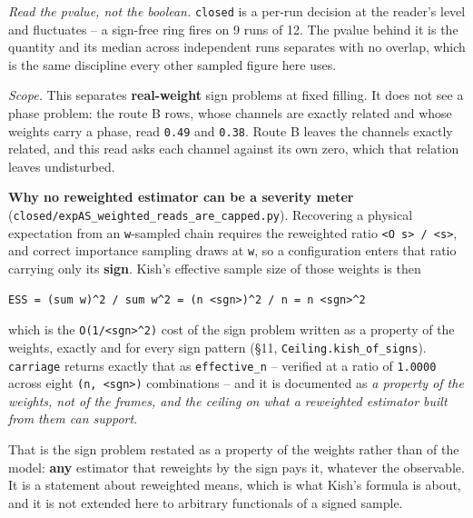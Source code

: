 \documentclass[10pt,letterpaper,twocolumn]{article}
\begin{document}
\emph{Read the pvalue, not the boolean.} \texttt{closed} is a per-run decision at the reader's level and
fluctuates -- a sign-free ring fires on 9 runs of 12. The pvalue behind it is the quantity and its
median across independent runs separates with no overlap, which is the same discipline every other
sampled figure here uses.

\emph{Scope.} This separates \textbf{real-weight} sign problems at fixed filling. It does not see a phase
problem: the route B rows, whose channels are exactly related and whose weights carry a phase,
read \texttt{0.\allowbreak{}49} and \texttt{0.\allowbreak{}38}. Route B leaves the channels exactly related, and this read asks each
channel against its own zero, which that relation leaves undisturbed.

\textbf{Why no reweighted estimator can be a severity meter}
(\texttt{closed/\allowbreak{}expAS\_\allowbreak{}weighted\_\allowbreak{}reads\_\allowbreak{}are\_\allowbreak{}capped.\allowbreak{}py}). Recovering a physical expectation from an
\texttt{\textbar{}\allowbreak{}w\textbar{}\allowbreak{}}-sampled chain requires the reweighted ratio \texttt{\textless{}\allowbreak{}O\ s\textgreater{}\allowbreak{}\ /\allowbreak{}\ \textless{}\allowbreak{}s\textgreater{}\allowbreak{}}, and correct importance sampling
draws at \texttt{\textbar{}\allowbreak{}w\textbar{}\allowbreak{}}, so a configuration enters that ratio carrying only its \textbf{sign}. Kish's effective
sample size of those weights is then

\begin{verbatim}
ESS = (sum w)^2 / sum w^2 = (n <sgn>)^2 / n = n <sgn>^2
\end{verbatim}

which is the \texttt{O(\allowbreak{}1/\allowbreak{}\textless{}\allowbreak{}sgn\textgreater{}\allowbreak{}\^{}2)\allowbreak{}} cost of the sign problem written as a property of the weights, exactly
and for every sign pattern (§11, \texttt{Ceiling.\allowbreak{}kish\_\allowbreak{}of\_\allowbreak{}signs}).
\texttt{carriage} returns exactly that as \texttt{effective\_\allowbreak{}n} -- verified at a ratio of \texttt{1.\allowbreak{}0000} across eight
\texttt{(\allowbreak{}n,\allowbreak{}\ \textless{}\allowbreak{}sgn\textgreater{}\allowbreak{})\allowbreak{}} combinations -- and it is documented as \emph{a property of the weights, not of the frames,
and the ceiling on what a reweighted estimator built from them can support}.

That is the sign problem restated as a property of the weights rather than of the model: \textbf{any}
estimator that reweights by the sign pays it, whatever the observable. It is a statement about
reweighted means, which is what Kish's formula is about, and it is not extended here to arbitrary
functionals of a signed sample.
\end{document}
